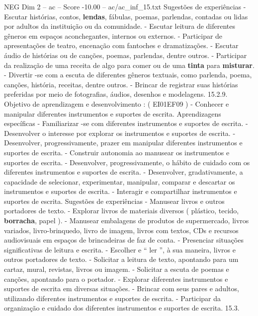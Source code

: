 \begin{textsample}{NEG Dim 2 – ac – Score -10.00 – ac/ac\_inf\_15.txt}
Sugestões de experiências - Escutar histórias, contos, \textbf{lendas}, fábulas, poemas, parlendas, contadas ou lidas por adultos da instituição ou da comunidade. - Escutar leitura de diferentes gêneros em espaços aconchegantes, internos ou externos. - Participar de apresentações de teatro, encenação com fantoches e dramatizações. - Escutar áudio de histórias ou de canções, poemas, parlendas, dentre outros. - Participar da realização de uma receita de algo para comer ou de uma \textbf{tinta} para \textbf{misturar}. - Divertir -se com a escuta de diferentes gêneros textuais, como parlenda, poema, canções, história, receitas, dentre outros. - Brincar de registrar suas histórias preferidas por meio de fotografias, áudios, desenhos e modelagens. 15.2.9.
Objetivo de aprendizagem e desenvolvimento : ( EI01EF09 ) - Conhecer e manipular diferentes instrumentos e suportes de escrita.
Aprendizagens específicas - Familiarizar -se com diferentes instrumentos e suportes de escrita. - Desenvolver o interesse por explorar os instrumentos e suportes de escrita. - Desenvolver, progressivamente, prazer em manipular diferentes instrumentos e suportes de escrita. - Construir autonomia ao manusear os instrumentos e suportes de escrita. - Desenvolver, progressivamente, o hábito de cuidado com os diferentes instrumentos e suportes de escrita. - Desenvolver, gradativamente, a capacidade de selecionar, experimentar, manipular, comparar e descartar os instrumentos e suportes de escrita. - Interagir e compartilhar instrumentos e suportes de escrita.
Sugestões de experiências - Manusear livros e outros portadores de texto. - Explorar livros de materiais diversos ( plástico, tecido, \textbf{borracha}, papel ). - Manusear embalagens de produtos de supermercado, livros variados, livro-brinquedo, livro de imagem, livros com textos, CDs e recursos audiovisuais em espaços de brincadeiras de faz de conta. - Presenciar situações significativas de leitura e escrita. - Escolher e “ ler ”, à sua maneira, livros e outros portadores de texto. - Solicitar a leitura de texto, apontando para um cartaz, mural, revistas, livros ou imagem. - Solicitar a escuta de poemas e canções, apontando para o portador. - Explorar diferentes instrumentos e suportes de escrita em diversas situações. - Brincar com seus pares e adultos, utilizando diferentes instrumentos e suportes de escrita. - Participar da organização e cuidado dos diferentes instrumentos e suportes de escrita. 15.3.

\end{textsample}
